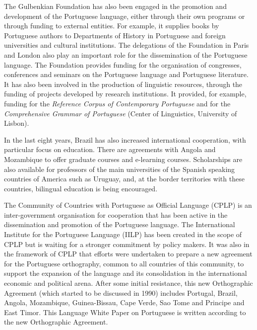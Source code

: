 \begin{multicols}{2}

The Gulbenkian Foundation\cite{gulbenkian} has also been engaged in the promotion and development of the Portuguese language, either through their own programs or through funding to external entities. For example, it supplies books by Portuguese authors to Departments of History in Portuguese and foreign universities and cultural institutions. The delegations of the Foundation in Paris and London also play an important role for the dissemination of the Portuguese language. The Foundation provides funding for the organisation of congresses, conferences and seminars on the Portuguese language and Portuguese literature. It has also been involved in the production of linguistic resources, through the funding of projects developed by research institutions. It provided, for example, funding for the \textit{Reference Corpus of Contemporary Portuguese} and for the \textit{Comprehensive Grammar of Portuguese} (Center of Linguistics, University of Lisbon).

In the last eight years, Brazil has also increased international cooperation, with particular focus on education. There are agreements with Angola and Mozambique to offer graduate courses and e-learning courses. Scholarships are also available for professors of the main universities of the Spanish speaking countries of America such as Uruguay, and, at the border territories with these countries, bilingual education is being encouraged.

The Community of Countries with Portuguese as Official Language (CPLP) is an inter-government organisation for cooperation that has been active in the dissemination and promotion of the Portuguese language. The International Institute for the Portuguese Language (IILP) has been created in the scope of CPLP but is waiting for a stronger commitment by policy makers. It was also in the framework of CPLP that efforts were undertaken to prepare a new agreement for the Portuguese orthography\cite{pinto}, common to all countries of this community, to support the expansion of the language and its consolidation in the international economic and political arena. After some initial resistance, this new Orthographic Agreement (which started to be discussed in 1990) includes Portugal, Brazil, Angola, Mozambique, Guinea-Bissau, Cape Verde, Sao Tome and Principe and East Timor. This Language White Paper on Portuguese is written according to the new Orthographic Agreement.


\end{multicols}
